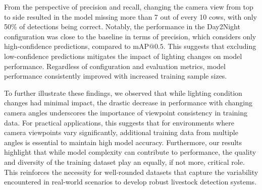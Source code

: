 From the perspective of precision and recall, changing the camera view from top to side resulted in the model missing more than 7 out of every 10 cows, with only 50\% of detections being correct. Notably, the performance in the Day2Night configuration was close to the baseline in terms of precision, which considers only high-confidence predictions, compared to $\text{mAP@{0.5}}$. This suggests that excluding low-confidence predictions mitigates the impact of lighting changes on model performance. Regardless of configuration and evaluation metrics, model performance consistently improved with increased training sample sizes.

To further illustrate these findings, we observed that while lighting condition changes had minimal impact, the drastic decrease in performance with changing camera angles underscores the importance of viewpoint consistency in training data. For practical applications, this suggests that for environments where camera viewpoints vary significantly, additional training data from multiple angles is essential to maintain high model accuracy. Furthermore, our results highlight that while model complexity can contribute to performance, the quality and diversity of the training dataset play an equally, if not more, critical role. This reinforces the necessity for well-rounded datasets that capture the variability encountered in real-world scenarios to develop robust livestock detection systems.




